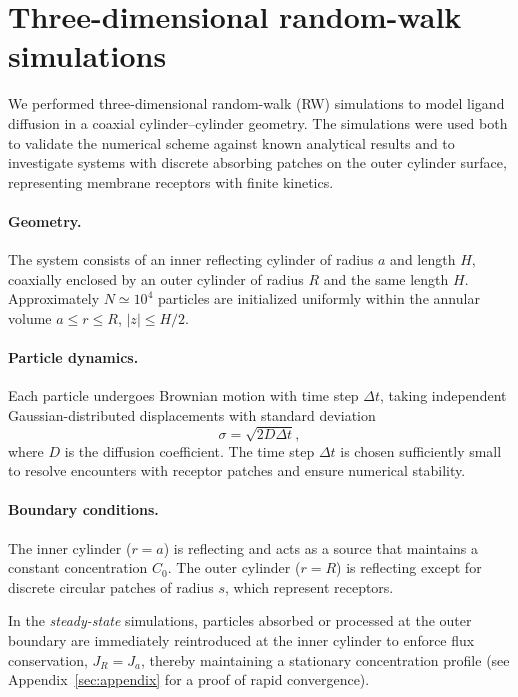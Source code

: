 \section{Three-dimensional random-walk simulations}\label{sec:rw}
We performed three-dimensional random-walk (RW) simulations to model ligand diffusion in a coaxial cylinder--cylinder geometry.
The simulations were used both to validate the numerical scheme against known analytical results and to investigate systems with discrete absorbing patches on the outer cylinder surface, representing membrane receptors with finite kinetics.

\paragraph{Geometry.}
The system consists of an inner reflecting cylinder of radius $a$ and length $H$, coaxially enclosed by an outer cylinder of radius $R$ and the same length $H$.
Approximately $N \simeq 10^{4}$ particles are initialized uniformly within the annular volume $a \le r \le R$, $|z| \le H/2$.

\paragraph{Particle dynamics.}
Each particle undergoes Brownian motion with time step $\Delta t$, taking independent Gaussian-distributed displacements with standard deviation
\begin{equation}
    \sigma = \sqrt{2 D \Delta t},
    \label{eq:brownian_step}
\end{equation}
where $D$ is the diffusion coefficient.
The time step $\Delta t$ is chosen sufficiently small to resolve encounters with receptor patches and ensure numerical stability.

\paragraph{Boundary conditions.}
The inner cylinder ($r = a$) is reflecting and acts as a source that maintains a constant concentration $C_{0}$.
The outer cylinder ($r = R$) is reflecting except for discrete circular patches of radius $s$, which represent receptors.

In the \textit{steady-state} simulations, particles absorbed or processed at the outer boundary are immediately reintroduced at the inner cylinder to enforce flux conservation, $J_{R} = J_{a}$, thereby maintaining a stationary concentration profile (see Appendix~\ref{sec:appendix} for a proof of rapid convergence).

